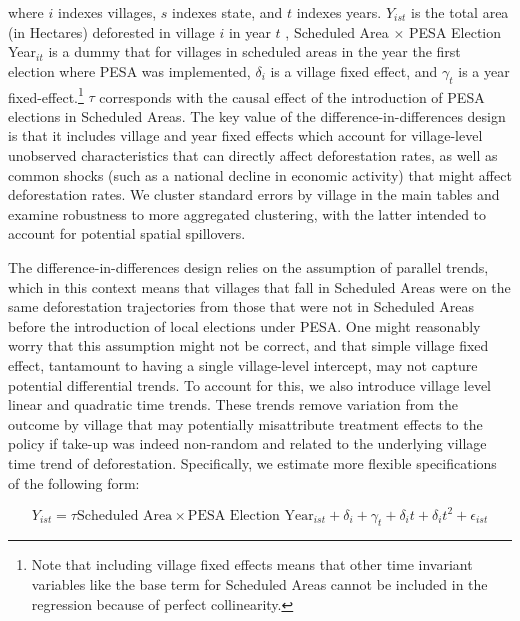 \documentclass[12pt,reqno]{article}
\begin{document}
where $i$ indexes villages, $s$ indexes state, and $t$ indexes years.
$Y_{ist}$ is the total area (in Hectares) deforested in village $i$ in
year $t$ , Scheduled Area $\times$ PESA Election Year$_{it}$ is a dummy
that for villages in scheduled areas in the year the first election
where PESA was implemented, $\delta_i$ is a village fixed effect, and $\gamma_t$ is a year fixed-effect.\footnote{Note that including village fixed effects means that other time invariant variables like the base term for Scheduled Areas cannot be included in the regression because of perfect collinearity.} $\tau$ corresponds with the causal effect of the introduction of PESA elections in Scheduled Areas.
The key value of the difference-in-differences design is that it includes village and year fixed effects which account for village-level unobserved characteristics that can directly affect deforestation rates, as well as common shocks (such as a national decline in economic activity) that might affect deforestation rates.  
We cluster standard errors by village in the main tables and examine robustness to more aggregated clustering, with the latter intended to account for potential spatial spillovers.  


The difference-in-differences design relies on the assumption of parallel trends, which in this context means that villages that fall in Scheduled Areas were on the same deforestation trajectories from those that were not in Scheduled Areas before the introduction of local elections under PESA. One might reasonably worry that this assumption might not be correct, and that simple village fixed effect, tantamount to having a single village-level intercept, may not capture potential differential trends. To account for this, we also introduce village level linear and quadratic time trends. These trends remove variation from the outcome by village that may potentially misattribute treatment effects to the policy if take-up was indeed non-random and related to the underlying village time trend of deforestation. Specifically, we estimate more flexible specifications of the following form:

\begin{equation}\label{ttrend}
Y_{ist} = \tau \text{Scheduled Area} \times \text{PESA Election Year}_{ist} +
\delta_i + \gamma_t + \delta_it + \delta_it^2 + \epsilon_{ist}
\end{equation}
\end{document}
